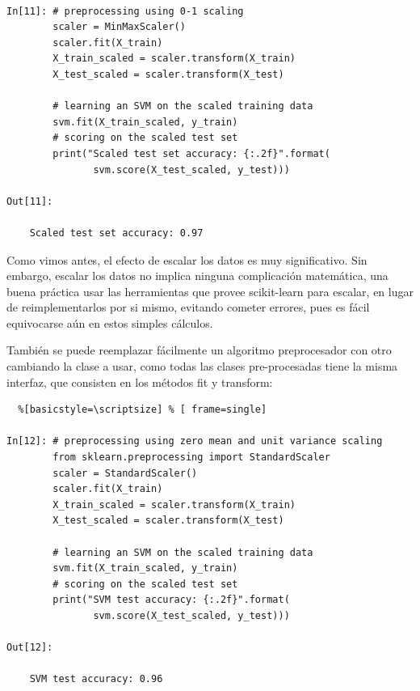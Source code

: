 \begin{lstlisting}  

In[11]: # preprocessing using 0-1 scaling
        scaler = MinMaxScaler()
        scaler.fit(X_train)
        X_train_scaled = scaler.transform(X_train)
        X_test_scaled = scaler.transform(X_test)
   
        # learning an SVM on the scaled training data
        svm.fit(X_train_scaled, y_train)
        # scoring on the scaled test set
        print("Scaled test set accuracy: {:.2f}".format(
               svm.score(X_test_scaled, y_test)))

Out[11]:

    Scaled test set accuracy: 0.97

\end{lstlisting} 

Como vimos antes, el efecto de escalar los datos es muy significativo. Sin embargo,
escalar los datos no implica ninguna complicación matemática, una buena  práctica usar las
herramientas que provee  {\ttfamily scikit-learn}  para escalar, en lugar de reimplementarlos por si mismo,
evitando  cometer errores, pues es fácil  equivocarse  aún en estos simples cálculos.

También se puede  reemplazar fácilmente   un algoritmo preprocesador con otro cambiando la
clase a usar, como todas las clases pre-procesadas tiene la misma interfaz, que  consisten  en
 los  métodos {\ttfamily fit}  y  {\ttfamily  transform}:\\



\begin{lstlisting}  %[basicstyle=\scriptsize] % [ frame=single]

In[12]: # preprocessing using zero mean and unit variance scaling
        from sklearn.preprocessing import StandardScaler
        scaler = StandardScaler()
        scaler.fit(X_train)
        X_train_scaled = scaler.transform(X_train)
        X_test_scaled = scaler.transform(X_test)
   
        # learning an SVM on the scaled training data
        svm.fit(X_train_scaled, y_train)
        # scoring on the scaled test set
        print("SVM test accuracy: {:.2f}".format(
               svm.score(X_test_scaled, y_test)))

Out[12]:

    SVM test accuracy: 0.96

\end{lstlisting} 

